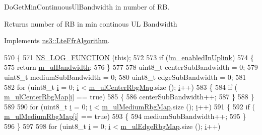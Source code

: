 Do\+Get\+Min\+Continuous\+Ul\+Bandwidth in number of RB. 

\begin{DoxyReturn}{Returns}
number of RB in min continous UL Bandwidth 
\end{DoxyReturn}


Implements \hyperlink{classns3_1_1LteFfrAlgorithm_a419e7a62dd16efa3d593d72e9495c724}{ns3\+::\+Lte\+Ffr\+Algorithm}.


\begin{DoxyCode}
570 \{
571   \hyperlink{log-macros-disabled_8h_a90b90d5bad1f39cb1b64923ea94c0761}{NS\_LOG\_FUNCTION} (\textcolor{keyword}{this});
572 
573   \textcolor{keywordflow}{if} (!\hyperlink{classns3_1_1LteFfrAlgorithm_a6c681821267dfedf7083600005db4bee}{m\_enabledInUplink})
574     \{
575       \textcolor{keywordflow}{return} \hyperlink{classns3_1_1LteFfrAlgorithm_acfa0105633ee5c27538c3309eb132d21}{m\_ulBandwidth};
576     \}
577 
578   uint8\_t centerSubBandwidth = 0;
579   uint8\_t mediumSubBandwidth = 0;
580   uint8\_t edgeSubBandwidth = 0;
581 
582   \textcolor{keywordflow}{for} (uint8\_t \hyperlink{bernuolliDistribution_8m_a6f6ccfcf58b31cb6412107d9d5281426}{i} = 0; \hyperlink{bernuolliDistribution_8m_a6f6ccfcf58b31cb6412107d9d5281426}{i} < \hyperlink{classns3_1_1LteFfrSoftAlgorithm_a8c4a9659b1df71b8a4e46b0dc7f678c5}{m\_ulCenterRbgMap}.size (); \hyperlink{bernuolliDistribution_8m_a6f6ccfcf58b31cb6412107d9d5281426}{i}++)
583     \{
584       \textcolor{keywordflow}{if} ( \hyperlink{classns3_1_1LteFfrSoftAlgorithm_a8c4a9659b1df71b8a4e46b0dc7f678c5}{m\_ulCenterRbgMap}[\hyperlink{bernuolliDistribution_8m_a6f6ccfcf58b31cb6412107d9d5281426}{i}] == \textcolor{keyword}{true})
585         \{
586           centerSubBandwidth++;
587         \}
588     \}
589 
590   \textcolor{keywordflow}{for} (uint8\_t \hyperlink{bernuolliDistribution_8m_a6f6ccfcf58b31cb6412107d9d5281426}{i} = 0; \hyperlink{bernuolliDistribution_8m_a6f6ccfcf58b31cb6412107d9d5281426}{i} < \hyperlink{classns3_1_1LteFfrSoftAlgorithm_a20218dc61eebe617493a976b83fa4e19}{m\_ulMediumRbgMap}.size (); \hyperlink{bernuolliDistribution_8m_a6f6ccfcf58b31cb6412107d9d5281426}{i}++)
591     \{
592       \textcolor{keywordflow}{if} ( \hyperlink{classns3_1_1LteFfrSoftAlgorithm_a20218dc61eebe617493a976b83fa4e19}{m\_ulMediumRbgMap}[\hyperlink{bernuolliDistribution_8m_a6f6ccfcf58b31cb6412107d9d5281426}{i}] == \textcolor{keyword}{true})
593         \{
594           mediumSubBandwidth++;
595         \}
596     \}
597 
598   \textcolor{keywordflow}{for} (uint8\_t \hyperlink{bernuolliDistribution_8m_a6f6ccfcf58b31cb6412107d9d5281426}{i} = 0; \hyperlink{bernuolliDistribution_8m_a6f6ccfcf58b31cb6412107d9d5281426}{i} < \hyperlink{classns3_1_1LteFfrSoftAlgorithm_a9ed12768474ee1b0292954bc23942a23}{m\_ulEdgeRbgMap}.size (); \hyperlink{bernuolliDistribution_8m_a6f6ccfcf58b31cb6412107d9d5281426}{i}++)

\end{DoxyCode}
